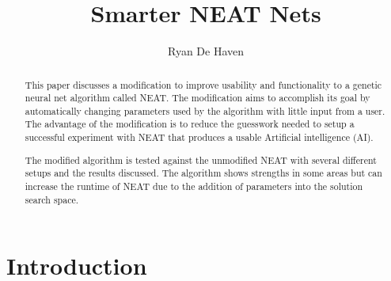 \documentclass[12pt]{ucthesis} \newif\ifpdf \ifx\pdfoutput\undefined
\begin{document}
\title{Smarter NEAT Nets}

\author{Ryan De Haven}
  
 
      


\maketitle

\begin{frontmatter}

\copyrightpage

\approvalpage

 
\begin{abstract}
This paper discusses a modification to improve usability and functionality to a
genetic neural net algorithm called NEAT. The modification aims to accomplish
its goal by automatically changing parameters used by the algorithm with little
input from a user. The advantage of the modification is to reduce the guesswork
needed to setup a successful experiment with NEAT that produces a usable
Artificial intelligence (AI).

The modified algorithm is tested against the unmodified NEAT with several
different setups and the results discussed. The algorithm shows strengths in some areas
but can increase the runtime of NEAT due to the addition of parameters into the
solution search space.

\end{abstract}

\begin{acknowledgements}

\end{acknowledgements}

\tableofcontents

\listoftables

\listoffigures

\end{frontmatter}

\pagestyle{plain}

\renewcommand{\baselinestretch}{1.66}


\chapter{Introduction}
\end{document}
